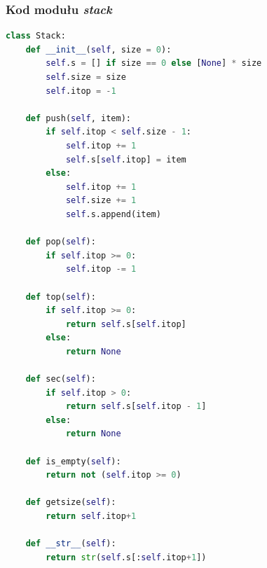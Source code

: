 \documentclass[11pt]{article}
\theoremstyle{remark} \newtheorem{definition}{def.}
\theoremstyle{definition} \newtheorem{twierdzenie}{tw.}
\begin{document}
\subsubsection*{Kod modułu \emph{stack}}
\begin{lstlisting}[language=Python]
class Stack:
    def __init__(self, size = 0):
        self.s = [] if size == 0 else [None] * size
        self.size = size
        self.itop = -1
    
    def push(self, item):
        if self.itop < self.size - 1:
            self.itop += 1
            self.s[self.itop] = item
        else:
            self.itop += 1
            self.size += 1
            self.s.append(item)
            
    def pop(self):
        if self.itop >= 0:
            self.itop -= 1

    def top(self):
        if self.itop >= 0:
            return self.s[self.itop]
        else:
            return None
    
    def sec(self):
        if self.itop > 0:
            return self.s[self.itop - 1]
        else:
            return None
        
    def is_empty(self):
        return not (self.itop >= 0)

    def getsize(self):
        return self.itop+1
    
    def __str__(self):
        return str(self.s[:self.itop+1])  
\end{lstlisting}
\end{document}
